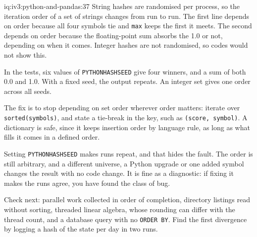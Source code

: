 \begin{solution}{iq:iv3:python-and-pandas:37}
String hashes are randomised per process, so the iteration order of a set of strings changes from run to run. The first line depends on order because all four symbols tie and \texttt{max} keeps the first it meets. The second depends on order because the floating-point sum absorbs the 1.0 or not, depending on when it comes. Integer hashes are not randomised, so codes would not show this.

In the tests, six values of \texttt{PYTHONHASHSEED} give four winners, and a sum of both 0.0 and 1.0. With a fixed seed, the output repeats. An integer set gives one order across all seeds.

The fix is to stop depending on set order wherever order matters: iterate over \texttt{sorted(symbols)}, and state a tie-break in the key, such as \texttt{(score, symbol)}. A dictionary is safe, since it keeps insertion order by language rule, as long as what fills it comes in a defined order.

Setting \texttt{PYTHONHASHSEED} makes runs repeat, and that hides the fault. The order is still arbitrary, and a different universe, a Python upgrade or one added symbol changes the result with no code change. It is fine as a diagnostic: if fixing it makes the runs agree, you have found the class of bug.

Check next: parallel work collected in order of completion, directory listings read without sorting, threaded linear algebra, whose rounding can differ with the thread count, and a database query with no \texttt{ORDER BY}. Find the first divergence by logging a hash of the state per day in two runs.

\end{solution}

